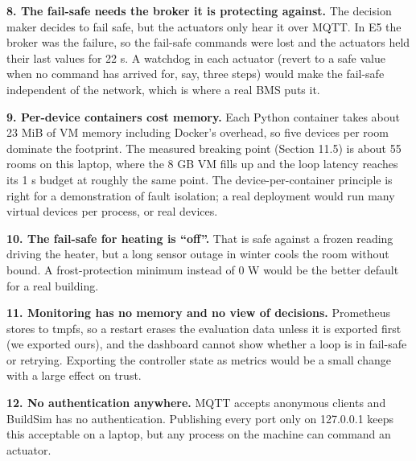 \documentclass[11pt]{article}
\makeatletter
\DeclareRobustCommand{\_}{\ifmmode\nfss@text{\textunderscore}\else\textunderscore\allowbreak\fi}
\makeatother
\begin{document}
\textbf{8. The fail-safe needs the broker it is protecting against.} The decision
maker decides to fail safe, but the actuators only hear it over MQTT. In E5 the
broker was the failure, so the fail-safe commands were lost and the actuators held
their last values for 22 s. A watchdog in each actuator (revert to a safe value
when no command has arrived for, say, three steps) would make the fail-safe
independent of the network, which is where a real BMS puts it.

\textbf{9. Per-device containers cost memory.} Each Python container takes about
23 MiB of VM memory including Docker's overhead, so five devices per room dominate
the footprint. The measured breaking point (Section 11.5) is about 55 rooms on
this laptop, where the 8 GB VM fills up and the loop latency reaches its 1 s
budget at roughly the same point. The device-per-container
principle is right for a demonstration of fault isolation; a real deployment would
run many virtual devices per process, or real devices.

\textbf{10. The fail-safe for heating is ``off''.} That is safe against a frozen
reading driving the heater, but a long sensor outage in winter cools the room
without bound. A frost-protection minimum instead of 0 W would be the better
default for a real building.

\textbf{11. Monitoring has no memory and no view of decisions.} Prometheus stores
to tmpfs, so a restart erases the evaluation data unless it is exported first (we
exported ours), and the dashboard cannot show whether a loop is in fail-safe or
retrying. Exporting the controller state as metrics would be a small change with a
large effect on trust.

\textbf{12. No authentication anywhere.} MQTT accepts anonymous clients and
BuildSim has no authentication. Publishing every port only on 127.0.0.1 keeps this
acceptable on a laptop, but any process on the machine can command an actuator.
\end{document}

